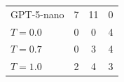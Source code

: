 \documentclass[a4paper,fleqn]{cas-sc}
\begin{document}
\begin{table}[]
\begin{tabular}{@{}l c c c@{}}
  GPT-5-nano            & 7  & 11 & 0 \\                                                                                                    
  $T=0.0$               & 0  & 0  & 4 \\                                                                                                    
  $T=0.7$               & 0  & 3  & 4 \\                                                                                                    
  $T=1.0$               & 2  & 4  & 3 \\                                                                                                    
  \bottomrule                                                                                                                               
  \end{tabular}                                                                                                                             
  \end{table}                                                                                                                               
                                                                                                                                            
\end{document}
